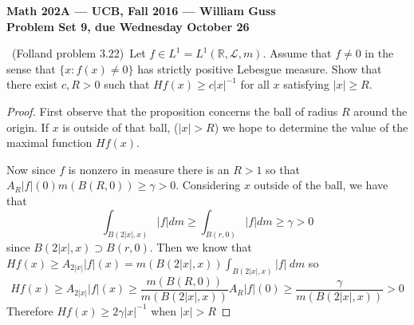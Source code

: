 \documentclass[11pt]{amsart}
\theoremstyle{definition}
\numberwithin{theorem}{section}
\numberwithin{definition}{section}
\numberwithin{equation}{section}
\def\reals{{\mathbb R}}
\def\scriptl{{\mathcal L}}
\begin{document}
\begin{center}{\bf Math 202A --- UCB, Fall 2016 --- William Guss}
\\
{\bf Problem Set 9, due Wednesday October 26}
\end{center}


\medskip {}\ (Folland problem 3.22)\ 
Let $f\in L^1=L^1(\reals,\scriptl,m)$. Assume that $f\ne 0$
in the sense that $\{x: f(x)\ne 0\}$ has strictly positive Lebesgue measure.
Show that there exist $c,R>0$ such that
$Hf(x)\ge c|x|^{-1}$ for all $x$ satisfying $|x|\ge R$.
\begin{proof}
	First observe that the proposition concerns the ball of radius $R$ around the origin.
	If $x$ is outside of that ball, ($|x| > R$) we hope to determine the value of the maximal function $Hf(x).$

	Now since $f$ is nonzero in measure there is an $R > 1$ so that $A_{R}|f|(0) m(B(R,0)) \geq \gamma > 0.$ Considering $x$ outside of the ball, we have that
	\begin{equation*}
		\int_{B(2|x|, x)} |f| dm \geq \int_{B(r, 0)} |f| dm \geq \gamma > 0
	\end{equation*}
	since $B(2|x|, x) \supset B(r, 0).$
	Then we know that $Hf(x) \geq A_{2|x|}|f|(x) = m(B(2|x|,x)) \int_{B(2|x|,x)} |f|\ dm$ so 
	\begin{equation*}
		Hf(x) \geq A_{2|x|}|f|(x) \geq \frac{m(B(R,0))}{m(B(2|x|, x))} A_R |f|(0) \geq \frac{\gamma}{m(B(2|x|, x))} > 0
	\end{equation*}
	Therefore $Hf(x) \geq 2\gamma|x|^{-1}$ when $|x| > R$
\end{proof}
\end{document}

